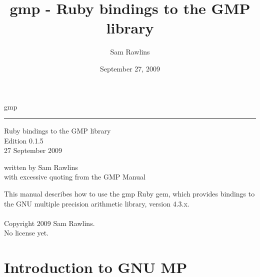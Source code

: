 \documentclass[pdftex,10pt]{article}
\title{gmp - Ruby bindings to the GMP library}
\date{September 27, 2009}
\author{Sam Rawlins}
\newcommand{\HRule}{\rule{\linewidth}{0.8mm}}
\begin{document}
\huge{gmp}\\
\HRule
\begin{flushright}
\large{Ruby bindings to the GMP library}\\
\large{Edition 0.1.5}\\
\large{27 September 2009}\\
\end{flushright}
\vfill
\large{written by Sam Rawlins}\\
\large{with excessive quoting from the GMP Manual}
\newpage

\vfill
This manual describes how to use the gmp Ruby gem, which provides bindings to
the GNU multiple precision arithmetic library, version 4.3.x.\\
\\
Copyright 2009 Sam Rawlins.\\
No license yet.
\newpage

\tableofcontents
\newpage

\section{Introduction to GNU MP}
\end{document}

